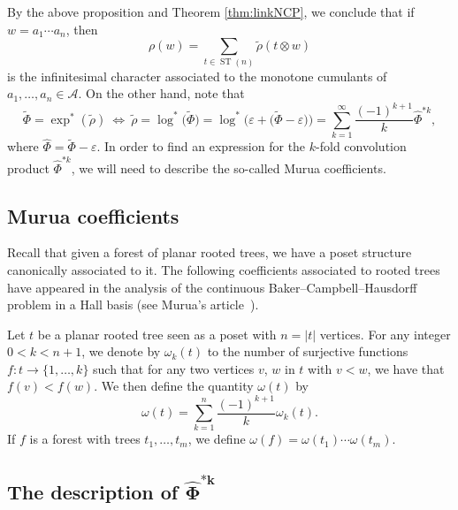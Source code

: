 \documentclass[11pt]{article}
\numberwithin{equation}{section}
\numberwithin{equation}{section}
\newcommand{\A}{\mathcal{A}}
\newcommand{\ST}{\operatorname{ST}}
\begin{document}
By the above proposition and Theorem \ref{thm:linkNCP}, we conclude that if $w=a_1\cdots a_n$, then
\begin{equation}
\label{eq:rhoiota}
\rho(w) = \sum_{t\in \ST(n)} \tilde{\rho}(t\otimes w)
\end{equation}
is the infinitesimal character associated to the monotone cumulants of $a_1,\dots,a_n\in \A$. On the other hand, note that
\[
	\tilde\Phi
	= \exp^*(\tilde\rho) \ \Leftrightarrow \ \tilde\rho
	= \log^*\big(\tilde\Phi\big)
	= \log^*\big(\varepsilon + \big(\tilde\Phi - \varepsilon\big)\big)
	= \sum_{k=1}^\infty \frac{(-1)^{k+1}}{k} \hat\Phi^{* k},
\]
where $\hat\Phi = \tilde\Phi - \varepsilon$. In order to find an expression for the $k$-fold convolution product $\hat\Phi^{*k}$, we will need to describe the so-called Murua coefficients.


\subsection{Murua coefficients}
\label{ssec:Murua}

Recall that given a forest of planar rooted trees, we have a poset structure canonically associated to it. The following coefficients associated to rooted trees have appeared in the analysis of the continuous Baker--Campbell--Hausdorff problem in a Hall basis (see Murua's article~\cite{Murua}).

\begin{Definition}
Let $t$ be a planar rooted tree seen as a poset with $n = |t|$ vertices. For any integer $0 < k< n+1$, we denote by $\omega_k(t)$ to the number of surjective functions $f\colon t\to \{1,\dots,k\}$ such that for any two vertices $v$, $w$ in $t$ with $v<w$, we have that $f(v)<f(w)$. We then define the quantity $\omega(t)$ by
\begin{equation}\label{eq:muruacoeff}
\omega(t) = \sum_{k=1}^n \frac{(-1)^{k+1}}{k} \omega_k(t).
\end{equation}
If $f$ is a forest with trees $t_1,\dots, t_m$, we define $\omega(f) = \omega(t_1)\cdots \omega(t_m).$
\end{Definition}

\setcounter{subsection}{1}\setcounter{Theorem}{5}\setcounter{equation}{6}
\subsection[The description of $\hat\Phi^{*k}$]{The description of $\boldsymbol{\hat\Phi^{*k}}$}\label{ssec:convolpower}
\end{document}
